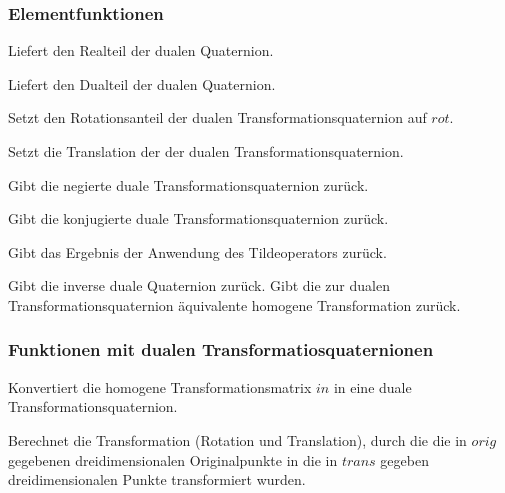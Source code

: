 	\subsubsection{Elementfunktionen}
		\descr
		{
			Liefert den Realteil der dualen Quaternion.
		}
		
		\descr
		{
			Liefert den Dualteil der dualen Quaternion.
		}
		
		\descr
		{
			Setzt den Rotationsanteil der dualen Transformationsquaternion auf $rot$.
		}
		
		\descr
		{
			Setzt die Translation der der dualen Transformationsquaternion.
		}
		
		\descr
		{
			Gibt die negierte duale Transformationsquaternion zurück.
		}
		
		\descr
		{
			Gibt die konjugierte duale Transformationsquaternion zurück.
		}
		
		\descr
		{
			Gibt das Ergebnis der Anwendung des Tildeoperators zurück.
		}
		
		\descr
		{
			Gibt die inverse duale Quaternion zurück.
		}
		\descr
		{
			Gibt die zur dualen Transformationsquaternion äquivalente homogene Transformation zurück.
		}
		\subsubsection{Funktionen mit dualen Transformatiosquaternionen}
 		\descr
 		{
 			Konvertiert die homogene Transformationsmatrix $in$ 
			in eine duale Transformationsquaternion.
 		}
 		
 		\descr
 		{
 			Berechnet die Transformation (Rotation und Translation), durch die die in $orig$ gegebenen 
 			dreidimensionalen Originalpunkte in die in $trans$ gegeben dreidimensionalen Punkte
 			transformiert wurden.
 		} 		
